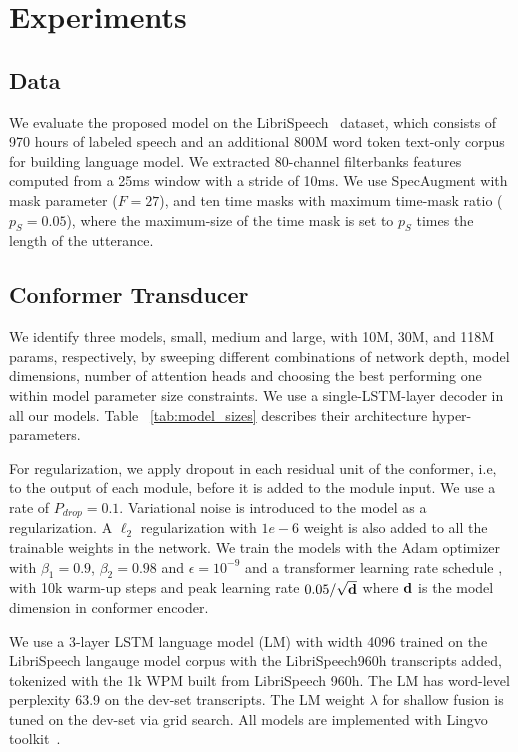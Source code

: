 \section{Experiments}
\vskip -0.1in
\label{sec:experiment}
\subsection{Data}
We evaluate the proposed model on the LibriSpeech~\cite{panayotov2015librispeech} dataset, which consists of 970 hours of labeled speech and an additional 800M word token text-only corpus for building language model. We extracted 80-channel filterbanks features computed from a 25ms window with a stride of 10ms. We use SpecAugment \cite{park2019specaugment, largespecaugment} with mask parameter ($F=27$), and ten time masks with maximum time-mask ratio ($p_S = 0.05$), where the maximum-size of the time mask is set to $p_S$ times the length of the utterance.

\subsection{Conformer Transducer}

We identify three models, small, medium and large, with 10M, 30M, and 118M params, respectively, by sweeping different combinations of network depth, model dimensions, number of attention heads and choosing the best performing one within model parameter size constraints. We use a single-LSTM-layer decoder in all our models.
Table ~\ref{tab:model_sizes} describes their architecture hyper-parameters. 

For regularization, we apply dropout \cite{JMLR:v15:srivastava14a} in each residual unit of the conformer, i.e, to the output of each module, before it is added to the module input. We use a rate of $P_{drop} = 0.1$. Variational noise \cite{graves2012sequence, jim1996analysis} is introduced to the model as a regularization. A $\ell_2$ regularization with $1e-6$ weight is also added to all the trainable weights in the network. We train the models with the Adam optimizer \cite{kingma2014adam} with $\beta_{1} = 0.9$, $\beta_{2} = 0.98$ and $\epsilon = 10^{-9}$ and a transformer learning rate schedule \cite{vaswani2017attention}, with 10k warm-up steps and peak learning rate $0.05/\sqrt{\bf{d}}$ where $\bf{d}$ is the model dimension in conformer encoder.   

We use a 3-layer LSTM language model (LM) with width 4096 trained on the LibriSpeech langauge model corpus with the LibriSpeech960h transcripts added, tokenized with the 1k WPM built from LibriSpeech 960h.  The LM has word-level perplexity 63.9 on the dev-set transcripts. The LM weight $\lambda$ for shallow fusion is tuned on the dev-set via grid search. All models are implemented with Lingvo toolkit~\cite{lingvo}.

